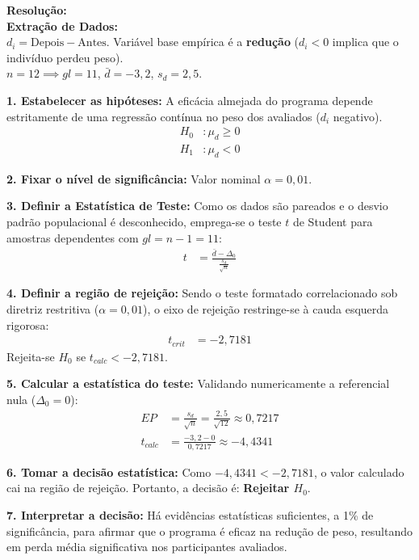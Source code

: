 \documentclass[12pt, a4paper]{article}
\begin{document}
\vspace{0.3cm}
\noindent\textbf{Resolução:}\\
\textbf{Extração de Dados:} \\
$d_i = \text{Depois} - \text{Antes}$. Variável base empírica é a \textbf{redução} ($d_i < 0$ implica que o indivíduo perdeu peso). \\
$n = 12 \implies gl = 11$, $\bar{d} = -3{,}2$, $s_d = 2{,}5$.

\medskip\noindent \textbf{1. Estabelecer as hipóteses:}
A eficácia almejada do programa depende estritamente de uma regressão contínua no peso dos avaliados ($d_i$ negativo).
\begin{align*}
H_0 &: \mu_d \ge 0 \\
H_1 &: \mu_d < 0
\end{align*}

\noindent \textbf{2. Fixar o nível de significância:}
Valor nominal $\alpha = 0{,}01$.

\noindent \textbf{3. Definir a Estatística de Teste:}
Como os dados são pareados e o desvio padrão populacional é desconhecido, 
emprega-se o teste $t$ de Student para amostras dependentes com $gl = n - 1 = 11$:
\begin{align*}
t &= \frac{\bar{d} - \Delta_0}{\frac{s_d}{\sqrt{n}}}
\end{align*}

\noindent \textbf{4. Definir a região de rejeição:}
Sendo o teste formatado correlacionado sob diretriz restritiva ($\alpha = 0{,}01$), o eixo de rejeição restringe-se à cauda esquerda rigorosa:
\begin{align*}
t_{crit} &= \boxed{-2{,}7181}
\end{align*}
Rejeita-se $H_0$ se $t_{calc} < -2{,}7181$.

\noindent \textbf{5. Calcular a estatística do teste:}
Validando numericamente a referencial nula ($\Delta_0 = 0$):
\begin{align*}
EP &= \frac{s_d}{\sqrt{n}} = \frac{2{,}5}{\sqrt{12}} \approx \boxed{0{,}7217} \\
t_{calc} &= \frac{-3{,}2 - 0}{0{,}7217} \approx \boxed{-4{,}4341}
\end{align*}

\noindent \textbf{6. Tomar a decisão estatística:}
Como $-4{,}4341 < -2{,}7181$, o valor calculado cai na região de rejeição. 
Portanto, a decisão é: \textbf{Rejeitar $H_0$}.

\noindent \textbf{7. Interpretar a decisão:}
Há evidências estatísticas suficientes, a 1\% de significância, para afirmar 
que o programa é eficaz na redução de peso, resultando em perda média 
significativa nos participantes avaliados.
\end{document}
